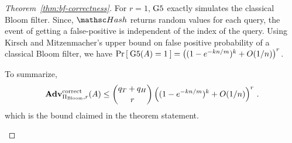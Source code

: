 \begin{proof}[Theorem~\ref{thm:bf-correctness}]
For $r=1$, $\text{G5}$ exactly simulates the classical Bloom filter. Since, $\Hash$ returns random values for each query, the event of getting a false-positive is independent of the index of the query. Using Kirsch and Mitzenmacher's upper bound on false positive probability of a classical Bloom filter, we have  $\Pr\left[\: \text{G5}(A)=1 \:\right] = \left( (1-e^{-kn/m})^k + O(1/n) \right)^r$.

To summarize, 
\[
\mathrm{\mathbf{Adv}}^{\mathrm{correct}}_{\Pi_{\mathrm{Bloom}},r}(A) \leq  {\dbinom{q_T + q_H}{r}} \left( (1-e^{-kn/m})^k + O(1/n) \right)^r\,.
\]
which is the bound claimed in the theorem statement.
\begin{figure}[tp]
\end{figure}
\end{proof}
